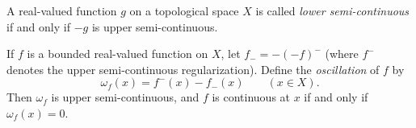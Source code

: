 A real-valued function $g$ on a topological space $X$ is called \emph{lower semi-continuous} if and only if $-g$ is upper semi-continuous.

If $f$ is a bounded real-valued function on $X$, let $f_{-} = -(-f)^{-}$ (where $f^{-}$ denotes the upper semi-continuous regularization). Define the \emph{oscillation} of $f$ by
\[
\omega_f(x) = f^{-}(x) - f_{-}(x) \qquad (x \in X).
\]
Then $\omega_f$ is upper semi-continuous, and $f$ is continuous at $x$ if and only if $\omega_f(x) = 0$.
